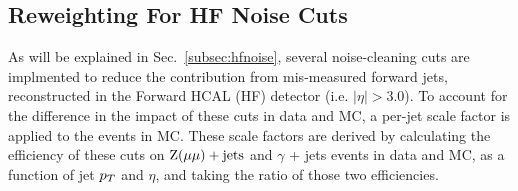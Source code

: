 



\subsection{Reweighting For HF Noise Cuts}
\label{subsec:hf_weighting}

As will be explained in Sec.~\ref{subsec:hfnoise}, several noise-cleaning cuts are implmented to reduce the contribution 
from mis-measured forward jets,
reconstructed in the Forward HCAL (HF) detector (i.e. $|\eta| > 3.0$). To account for the difference in the impact of these cuts in
data and MC, a per-jet scale factor is applied to the events in MC. These scale factors are derived by calculating the efficiency 
of these cuts on $\mathrm{Z}(\mu\mu)+\textrm{jets}$ and $\gamma$ + jets events in data and MC, as a function of jet $p_T$ and $\eta$, and taking 
the ratio of those two efficiencies. 

